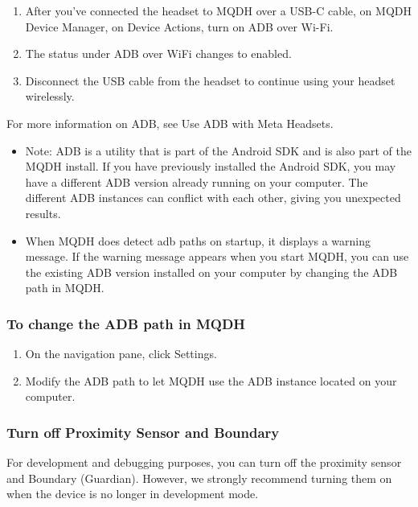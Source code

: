 \documentclass{article}
\begin{document}
\begin{enumerate}
    \item After you’ve connected the headset to MQDH over a USB-C cable, on MQDH Device Manager, on Device Actions, turn on ADB over Wi-Fi.
    \item The status under ADB over WiFi changes to enabled.
    \item Disconnect the USB cable from the headset to continue using your headset wirelessly.
\end{enumerate}

For more information on ADB, see Use ADB with Meta Headsets.

\begin{itemize}
    \item Note: ADB is a utility that is part of the Android SDK and is also part of the MQDH install. If you have previously installed the Android SDK, you may have a different ADB version already running on your computer. The different ADB instances can conflict with each other, giving you unexpected results.
    \item When MQDH does detect adb paths on startup, it displays a warning message. If the warning message appears when you start MQDH, you can use the existing ADB version installed on your computer by changing the ADB path in MQDH.
\end{itemize}

\subsubsection{To change the ADB path in MQDH}

\begin{enumerate}
    \item On the navigation pane, click Settings.
    \item Modify the ADB path to let MQDH use the ADB instance located on your computer.
\end{enumerate}

\subsubsection{Turn off Proximity Sensor and Boundary}

For development and debugging purposes, you can turn off the proximity sensor and Boundary (Guardian). However, we strongly recommend turning them on when the device is no longer in development mode.
\end{document}
